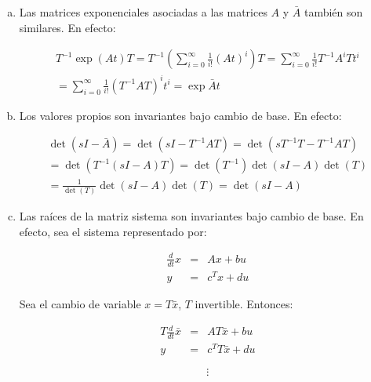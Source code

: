 \begin{enumerate}[i)]
            \begin{enumerate}[a)]
                \item Las matrices exponenciales asociadas a las matrices $A$ y $\bar{A}$ también son similares. En efecto:

                \begin{multline}
                    T^{-1} \exp{(At)} T = T^{-1} \left( \sum\limits_{i=0}^{\infty} \frac{1}{i!} (A t)^i \right) T = \sum\limits_{i=0}^{\infty} \frac{1}{i!} T^{-1} A^i T t^i \\
                    = \sum\limits_{i=0}^{\infty} \frac{1}{i!} (T^{-1} A T)^i t^i = \exp{\bar{A} t} \nonumber
                \end{multline}

                \item Los valores propios son invariantes bajo cambio de base. En efecto:

                \begin{multline}
                    \det{(sI - \bar{A})} = \det{(sI - T^{-1} A T)} = \det{(s T^{-1} T - T^{-1} A T)} \\
                    = \det{(T^{-1} (sI - A) T)} = \det{(T^{-1})} \det{(sI - A)} \det{(T)} \\
                    = \frac{1}{\det{(T)}} \det{(sI - A)} \det{(T)} = \det{(sI - A)} \nonumber
                \end{multline}

                \item Las raíces de la matriz sistema son invariantes bajo cambio de base. En efecto, sea el sistema representado por:

                \begin{eqnarray}
                \frac{d}{dt} x & = & A x + b u \nonumber \\
                y & = & c^T x + d u \nonumber
                \end{eqnarray}

                Sea el cambio de variable $x = T \bar{x}$, $T$ invertible. Entonces:

                \begin{eqnarray}
                T \frac{d}{dt} \bar{x} & = & A T \bar{x} + b u \nonumber \\
                y & = & c^T T \bar{x} + d u \nonumber
                \end{eqnarray}

                \begin{equation}
                    \vdots \nonumber
                \end{equation}


\end{enumerate}
\end{enumerate}
